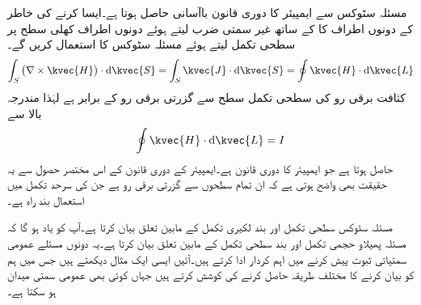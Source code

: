 مسئلہ سٹوکس سے ایمپیئر کا دوری قانون باآسانی حاصل ہوتا ہے۔ایسا کرنے کی خاطر   کے دونوں اطراف کا  کے ساتھ غیر سمتی ضرب لیتے ہوئے دونوں اطراف کھلی سطح  پر سطحی تکمل لیتے  ہوئے مسئلہ سٹوکس کا استعمال کریں گے۔ 
\begin{align*}
\int_S \left(\nabla \times \kvec{H} \right) \cdot \dif \kvec{S}=\int_S \kvec{J} \cdot \dif \kvec{S}=\oint \kvec{H} \cdot \dif \kvec{L}
\end{align*}
کثافت برقی رو کی سطحی تکمل سطح  سے گزرتی برقی رو کے برابر ہے لہٰذا مندرجہ بالا سے
\begin{align*}
\oint \kvec{H} \cdot \dif \kvec{L}=I
\end{align*}
حاصل ہوتا ہے جو ایمپیئر کا دوری قانون ہے۔ایمپیئر کے دوری قانون کے اس مختصر حصول سے یہ حقیقت بھی واضح ہوتی ہے کہ  ان تمام سطحوں سے گزرتی برقی رو ہے جن کی سرحد تکمل میں استعمال بند راہ ہے۔

مسئلہ سٹوکس  سطحی تکمل  اور بند لکیری تکمل کے مابین تعلق بیان کرتا ہے۔آپ کو یاد ہو گا کہ مسئلہ پھیلاو حجمی تکمل اور بند سطحی تکمل کے مابین تعلق بیان کرتا ہے۔یہ دونوں مسئلے عمومی سمتیاتی ثبوت پیش کرنے میں اہم کردار ادا کرتے ہیں۔آئیں ایسی ایک مثال دیکھتے ہیں جس میں ہم  کو بیان کرنے  کا مختلف طریقہ حاصل کرنے کی کوشش کرتے ہیں  جہاں  کوئی بھی عمومی سمتی میدان ہو سکتا ہے۔

